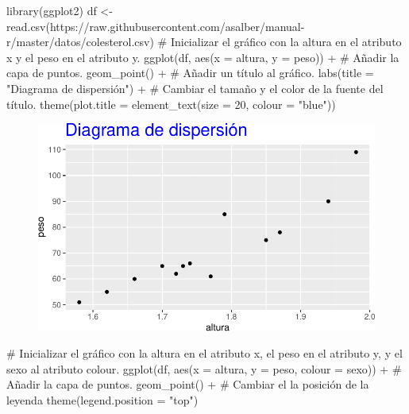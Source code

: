 \documentclass[
  a4paper,
]{scrreport}
\newenvironment{Shaded}{\begin{snugshade}}{\end{snugshade}}
\newcommand{\AttributeTok}[1]{\textcolor[rgb]{0.40,0.45,0.13}{#1}}
\newcommand{\CommentTok}[1]{\textcolor[rgb]{0.37,0.37,0.37}{#1}}
\newcommand{\DecValTok}[1]{\textcolor[rgb]{0.68,0.00,0.00}{#1}}
\newcommand{\FunctionTok}[1]{\textcolor[rgb]{0.28,0.35,0.67}{#1}}
\newcommand{\NormalTok}[1]{\textcolor[rgb]{0.00,0.23,0.31}{#1}}
\newcommand{\OtherTok}[1]{\textcolor[rgb]{0.00,0.23,0.31}{#1}}
\newcommand{\SpecialCharTok}[1]{\textcolor[rgb]{0.37,0.37,0.37}{#1}}
\newcommand{\StringTok}[1]{\textcolor[rgb]{0.13,0.47,0.30}{#1}}
\theoremstyle{definition}
\theoremstyle{definition}
\theoremstyle{remark}
\begin{document}
\begin{Shaded}
\begin{Highlighting}[]
\FunctionTok{library}\NormalTok{(ggplot2)}
\NormalTok{df }\OtherTok{\textless{}{-}} \FunctionTok{read.csv}\NormalTok{(}\StringTok{\textquotesingle{}https://raw.githubusercontent.com/asalber/manual{-}r/master/datos/colesterol.csv\textquotesingle{}}\NormalTok{)}
\CommentTok{\# Inicializar el gráfico con la altura en el atributo x y el peso en el atributo y.}
\FunctionTok{ggplot}\NormalTok{(df, }\FunctionTok{aes}\NormalTok{(}\AttributeTok{x =}\NormalTok{ altura, }\AttributeTok{y =}\NormalTok{ peso)) }\SpecialCharTok{+}
\CommentTok{\# Añadir la capa de puntos.}
    \FunctionTok{geom\_point}\NormalTok{() }\SpecialCharTok{+}
\CommentTok{\# Añadir un título al gráfico.}
    \FunctionTok{labs}\NormalTok{(}\AttributeTok{title =} \StringTok{"Diagrama de dispersión"}\NormalTok{) }\SpecialCharTok{+}
\CommentTok{\# Cambiar el tamaño y el color de la fuente del título.}
    \FunctionTok{theme}\NormalTok{(}\AttributeTok{plot.title =} \FunctionTok{element\_text}\NormalTok{(}\AttributeTok{size =} \DecValTok{20}\NormalTok{, }\AttributeTok{colour =} \StringTok{"blue"}\NormalTok{))}
\end{Highlighting}
\end{Shaded}

\begin{figure}[H]

{\centering \includegraphics{./07-graficos_files/figure-pdf/unnamed-chunk-30-1.pdf}

}

\end{figure}

\begin{Shaded}
\begin{Highlighting}[]
\CommentTok{\# Inicializar el gráfico con la altura en el atributo x, el peso en el atributo y, y el sexo al atributo colour.}
\FunctionTok{ggplot}\NormalTok{(df, }\FunctionTok{aes}\NormalTok{(}\AttributeTok{x =}\NormalTok{ altura, }\AttributeTok{y =}\NormalTok{ peso, }\AttributeTok{colour =}\NormalTok{ sexo)) }\SpecialCharTok{+}
\CommentTok{\# Añadir la capa de puntos.}
    \FunctionTok{geom\_point}\NormalTok{() }\SpecialCharTok{+}
\CommentTok{\# Cambiar el la posición de la leyenda}
    \FunctionTok{theme}\NormalTok{(}\AttributeTok{legend.position =} \StringTok{"top"}\NormalTok{)}
\end{Highlighting}
\end{Shaded}
\end{document}
